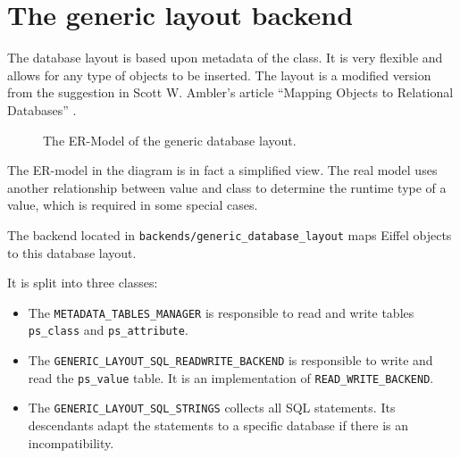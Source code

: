 \documentclass[a4paper,12pt]{report}
\begin{document}
\section{The generic layout backend}

The database layout is based upon metadata of the class. 
It is very flexible and allows for any type of objects to be inserted.
The layout is a modified version from the suggestion in Scott W. Ambler's article ``Mapping Objects to Relational Databases'' \cite{AmblerORM}.

\begin{figure} [h!]
\centering
{}
\caption{The ER-Model of the generic database layout.}
\label{fig:er_model_generic_layout}
\end{figure}

The ER-model in the diagram is in fact a simplified view. 
The real model uses another relationship between value and class to determine the runtime type of a value, which is required in some special cases.

The backend located in \lstinline!backends/generic_database_layout! maps Eiffel objects to this database layout.

It is split into three classes:
\begin{itemize}
 \item The \lstinline!METADATA_TABLES_MANAGER! is responsible to read and write tables \lstinline!ps_class! and \lstinline!ps_attribute!.
 \item The \lstinline!GENERIC_LAYOUT_SQL_READWRITE_BACKEND! is responsible to write and read the \lstinline!ps_value! table. It is an implementation of \lstinline!READ_WRITE_BACKEND!.
 \item The \lstinline!GENERIC_LAYOUT_SQL_STRINGS! collects all SQL statements. Its descendants adapt the statements to a specific database if there is an incompatibility.
\end{itemize}
\end{document}
